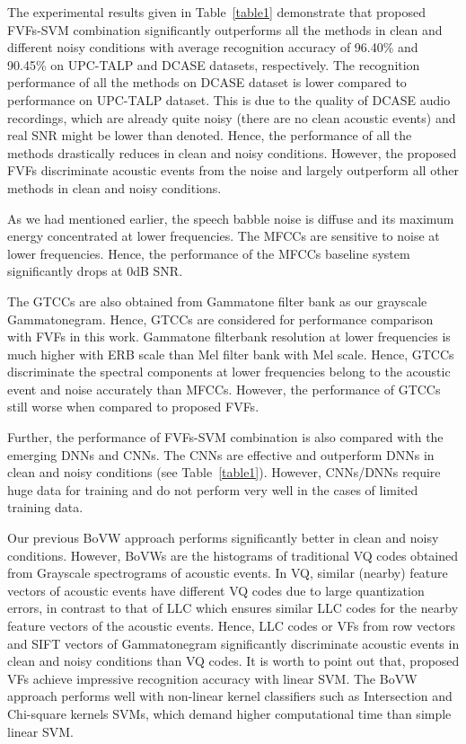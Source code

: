 \documentclass[a4paper]{article}
\begin{document}
The experimental results given in Table~\ref{table1} demonstrate that proposed FVFs-SVM combination significantly outperforms all the methods in clean and different noisy conditions with average recognition accuracy of 96.40\% and 90.45\% on UPC-TALP and DCASE datasets, respectively. The recognition performance of all the methods on DCASE dataset is lower compared to performance on UPC-TALP dataset. This is due to the quality of DCASE audio recordings, which are already quite noisy (there are no clean acoustic events) and real SNR might be lower than denoted. Hence, the performance of all the methods drastically reduces in clean and noisy conditions. However, the proposed FVFs discriminate acoustic events from the noise and largely outperform all other methods in clean and noisy conditions.

As we had mentioned earlier, the speech babble noise is diffuse and its maximum energy concentrated at lower frequencies. The MFCCs are sensitive to noise at lower frequencies. Hence, the performance of the MFCCs baseline system significantly drops at 0dB SNR.

The GTCCs are also obtained from Gammatone filter bank as our grayscale Gammatonegram. Hence, GTCCs are considered for performance comparison with FVFs in this
work. Gammatone filterbank resolution at lower frequencies
is much higher with ERB scale than Mel filter bank with Mel
scale. Hence, GTCCs discriminate the spectral components at lower frequencies belong to the acoustic event and
noise accurately than MFCCs. However, the performance of
GTCCs still worse when compared to proposed FVFs.

Further, the performance of FVFs-SVM combination is also compared with the emerging DNNs and CNNs. The CNNs are effective and outperform DNNs in clean and noisy conditions (see Table~\ref{table1}). However, CNNs/DNNs require huge data for training and do not perform very well in the cases of limited training data.  

Our previous BoVW approach \cite{mulimani2018robust} performs significantly better in clean and noisy conditions. However, BoVWs are the histograms of traditional VQ codes obtained from Grayscale spectrograms of acoustic events. In VQ, similar (nearby) feature vectors of acoustic events have different VQ codes due to large quantization errors, in contrast to that of LLC which ensures similar LLC codes for the nearby feature vectors of the acoustic events.   Hence, LLC codes or VFs from row vectors and SIFT vectors of Gammatonegram significantly discriminate acoustic events in clean and noisy conditions than VQ codes.  It is worth to point out that, proposed VFs achieve impressive recognition accuracy with linear SVM. The BoVW approach performs well with non-linear kernel classifiers such as Intersection and Chi-square kernels SVMs, which demand higher computational time than simple linear SVM. 
\end{document}
